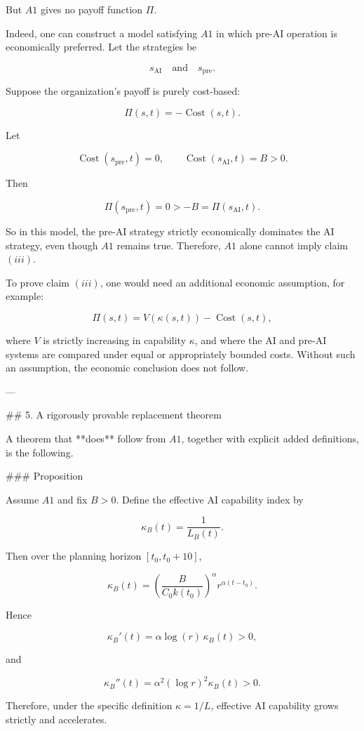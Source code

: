 But $A1$ gives no payoff function $\Pi$.

Indeed, one can construct a model satisfying $A1$ in which pre-AI operation is economically preferred. Let the strategies be

\[
s_{\mathrm{AI}}
\quad\text{and}\quad
s_{\mathrm{pre}}.
\]

Suppose the organization’s payoff is purely cost-based:

\[
\Pi(s,t)=-\operatorname{Cost}(s,t).
\]

Let

\[
\operatorname{Cost}(s_{\mathrm{pre}},t)=0,
\qquad
\operatorname{Cost}(s_{\mathrm{AI}},t)=B>0.
\]

Then

\[
\Pi(s_{\mathrm{pre}},t)=0
>
-B
=
\Pi(s_{\mathrm{AI}},t).
\]

So in this model, the pre-AI strategy strictly economically dominates the AI strategy, even though $A1$ remains true. Therefore, $A1$ alone cannot imply claim $(iii)$.

To prove claim $(iii)$, one would need an additional economic assumption, for example:

\[
\Pi(s,t)=V(\kappa(s,t))-\operatorname{Cost}(s,t),
\]

where $V$ is strictly increasing in capability $\kappa$, and where the AI and pre-AI systems are compared under equal or appropriately bounded costs. Without such an assumption, the economic conclusion does not follow.

---

## 5. A rigorously provable replacement theorem

A theorem that **does** follow from $A1$, together with explicit added definitions, is the following.

### Proposition

Assume $A1$ and fix $B>0$. Define the effective AI capability index by

\[
\kappa_B(t)=\frac{1}{L_B(t)}.
\]

Then over the planning horizon $[t_0,t_0+10]$,

\[
\kappa_B(t)
=
\left(\frac{B}{C_0k(t_0)}\right)^\alpha r^{\alpha(t-t_0)}.
\]

Hence

\[
\kappa_B'(t)
=
\alpha\log(r)\,\kappa_B(t)>0,
\]

and

\[
\kappa_B''(t)
=
\alpha^2(\log r)^2\kappa_B(t)>0.
\]

Therefore, under the specific definition $\kappa=1/L$, effective AI capability grows strictly and accelerates.

